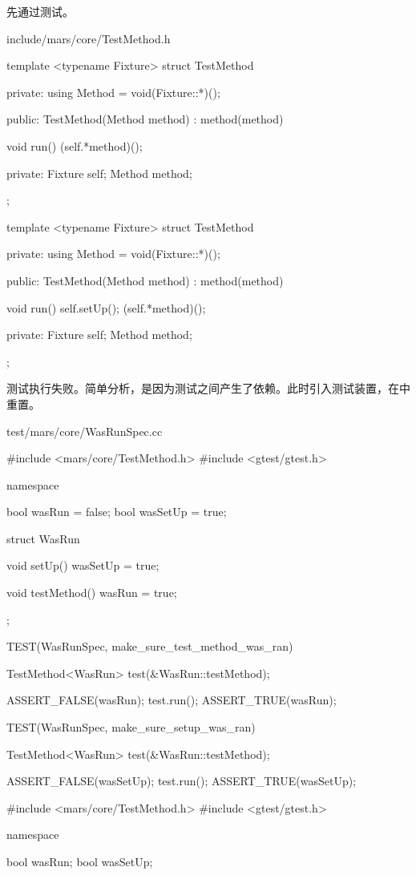 \begin{content}
先通过测试。

\begin{diff}{include/mars/core/TestMethod.h}
\begin{minicpp}
template <typename Fixture>
struct TestMethod {
private:
  using Method = void(Fixture::*)();

public:
  TestMethod(Method method)
    : method(method) {}

  void run() {
    (self.*method)();
  }

private:
  Fixture self;
  Method method;
};
\end{minicpp}
\tcblower
\begin{minicpp}
template <typename Fixture>
struct TestMethod {
private:
  using Method = void(Fixture::*)();

public:
  TestMethod(Method method)
    : method(method) {}

  void run() {
    self.setUp();
    (self.*method)();
  }

private:
  Fixture self;
  Method method;
};
\end{minicpp}
\end{diff}

测试执行失败。简单分析，是因为测试之间产生了依赖。此时引入测试装置，在中重置。

\begin{diff}{test/mars/core/WasRunSpec.cc}
\begin{minicpp}
#include <mars/core/TestMethod.h>
#include <gtest/gtest.h>

namespace {
  bool wasRun = false;
  bool wasSetUp = true;

  struct WasRun {
    void setUp() {
      wasSetUp = true;
    }

    void testMethod() {
      wasRun = true;
    }
  };
}

TEST(WasRunSpec, make_sure_test_method_was_ran) {
  TestMethod<WasRun> test(&WasRun::testMethod);

  ASSERT_FALSE(wasRun);
  test.run();
  ASSERT_TRUE(wasRun);
}

TEST(WasRunSpec, make_sure_setup_was_ran) {
  TestMethod<WasRun> test(&WasRun::testMethod);

  ASSERT_FALSE(wasSetUp);
  test.run();
  ASSERT_TRUE(wasSetUp);
}
\end{minicpp}
\tcblower
\begin{minicpp}
#include <mars/core/TestMethod.h>
#include <gtest/gtest.h>

namespace {
  bool wasRun;
  bool wasSetUp;

}
\end{minicpp}
\end{diff}
\end{content}
